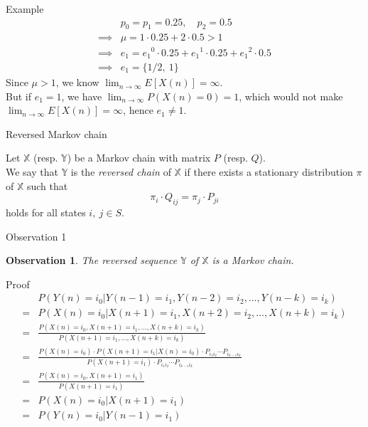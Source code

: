 \documentclass[mathserif]{beamer}
\newtheorem{obs}{Observation}
\begin{document}
\begin{frame}{Example}
\begin{align*}
& p_0 = p_1 = 0.25,\quad p_2 = 0.5 \\
\implies & \mu = 1 \cdot 0.25 + 2 \cdot 0.5 > 1 \\
\implies & e_1 = {e_1}^0 \cdot 0.25 + {e_1}^1 \cdot 0.25 + {e_1}^2 \cdot 0.5 \\
\implies & e_1 = \{1/2,~1\}
\end{align*}
Since $\mu > 1$, we know $\lim_{n\to\infty} E[X(n)] = \infty$.\\
But if $e_1 = 1$, we have $\lim_{n\to\infty} P(X(n) = 0) = 1$, which would not make $\lim_{n\to\infty} E[X(n)] = \infty$, hence $e_1 \neq 1$.
\end{frame}

\begin{frame}{Reversed Markov chain}
\begin{definition}
Let $\mathbb{X}$ (resp. $\mathbb{Y}$) be a Markov chain with matrix $P$ (resp. $Q$).\\
We say that $\mathbb{Y}$ is the \textit{reversed chain} of $\mathbb{X}$ if there exists a stationary distribution $\pi$ of $\mathbb{X}$ such that
\[
\pi_i \cdot Q_{ij} = \pi_j \cdot P_{ji}
\]
holds for all states $i,~ j \in S$.
\end{definition}
\end{frame}

\begin{frame}{Observation 1}
\begin{obs}
The reversed sequence $\mathbb{Y}$ of $\mathbb{X}$ is a Markov chain.
\end{obs}
\end{frame}

\begin{frame}{Proof}
\begin{align*}
& P(Y(n) = i_0 | Y(n-1) = i_1, Y(n-2) = i_2, \ldots , Y(n-k) = i_k) \\
= & P(X(n) = i_0 | X(n+1) = i_1, X(n+2) = i_2, \ldots , X(n+k) = i_k) \\
= & \frac{P(X(n) = i_0, X(n+1) = i_1, \ldots , X(n+k) = i_k)}{P(X(n+1) = i_1, \ldots , X(n+k) = i_k)} \\
= & \frac{P(X(n)=i_0)\cdot P(X(n+1)=i_1|X(n)=i_0)\cdot P_{i_1 i_2}\cdots P_{i_{k-1}i_k}}{P(X(n+1)=i_1)\cdot P_{i_1 i_2}\cdots P_{i_{k-1}i_k}} \\
= & \frac{P(X(n)=i_0, X(n+1)=i_1)}{P(X(n+1)=i_1)} \\
= & P(X(n)=i_0|X(n+1)=i_1) \\
= & P(Y(n)=i_0|Y(n-1)=i_1)
\end{align*}
\end{frame}
\end{document}
